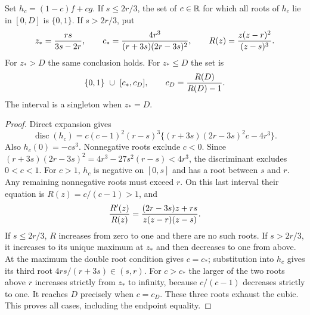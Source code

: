 \begin{lemma}\label{lem:pencil-classification-v95}
Set $h_c=(1-c)f+cg$. If $s\le2r/3$, the set of $c\in\mathbb R$ for which
all roots of $h_c$ lie in $[0,D]$ is $\{0,1\}$. If $s>2r/3$, put
\begin{equation}\label{eq:pencil-thresholds-v95}
 z_*={rs\over3s-2r},\qquad
 c_*={4r^3\over(r+3s)(2r-3s)^2},\qquad
 R(z)={z(z-r)^2\over(z-s)^3}.
\end{equation}
For $z_*>D$ the same conclusion holds. For $z_*\le D$ the set is
\begin{equation}\label{eq:complete-pencil-v95}
 \{0,1\}\ \cup\ [c_*,c_D],\qquad c_D={R(D)\over R(D)-1}.
\end{equation}
The interval is a singleton when $z_*=D$.
\end{lemma}
\begin{proof}
Direct expansion gives
\begin{equation}\label{eq:discriminant-v95}
 \operatorname{disc}(h_c)
 =c(c-1)^2(r-s)^3\{(r+3s)(2r-3s)^2c-4r^3\}.
\end{equation}
Also $h_c(0)=-cs^3$. Nonnegative roots exclude $c<0$.
Since $(r+3s)(2r-3s)^2=4r^3-27s^2(r-s)<4r^3$, the discriminant
excludes $0<c<1$. For $c>1$, $h_c$ is negative on $[0,s]$ and has a
root between $s$ and $r$. Any remaining nonnegative roots must exceed
$r$. On this last interval their equation is $R(z)=c/(c-1)>1$, and
\[
 {R'(z)\over R(z)}
 ={(2r-3s)z+rs\over z(z-r)(z-s)}.
\]
If $s\le2r/3$, $R$ increases from zero to one and there are no such
roots. If $s>2r/3$, it increases to its unique maximum at $z_*$ and
then decreases to one from above. At the maximum the double root
condition gives $c=c_*$; substitution into $h_c$ gives its third root
$4rs/(r+3s)\in(s,r)$. For $c>c_*$ the larger of the two roots above
$r$ increases strictly from $z_*$ to infinity, because $c/(c-1)$
decreases strictly to one. It reaches $D$ precisely when $c=c_D$.
These three roots exhaust the cubic. This proves all cases, including
the endpoint equality.
\end{proof}

